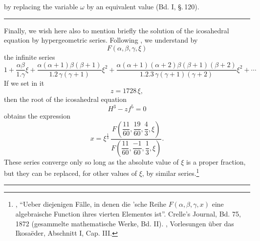 by replacing the variable $\omega$ by an equivalent value (Bd. I, \S.\,120).

\begin{center}
\rule{0.25\linewidth}{0.4pt}
\end{center}

Finally, we wish here also to mention briefly the solution of the icosahedral equation by hypergeometric series. Following , we understand by
\[
F(\alpha, \beta, \gamma, \xi)
\]
the infinite series
\[
1 + \frac{\alpha\beta}{1.\gamma}\xi + \frac{\alpha(\alpha+1)\beta(\beta+1)}{1.2\,\gamma(\gamma+1)}\xi^2 + \frac{\alpha(\alpha+1)(\alpha+2)\beta(\beta+1)(\beta+2)}{1.2.3\,\gamma(\gamma+1)(\gamma+2)}\xi^2 + \cdots
\]
If we set in it
\[
z = 1728\,\xi,
\]
then the root of the icosahedral equation
\[
H^3 - zf^5 = 0
\]
obtains the expression
\[
x = \xi^{\frac{1}{3}}\,\frac{F\left(\dfrac{11}{60}, \dfrac{19}{60}, \dfrac{4}{3}, \xi\right)}{F\left(\dfrac{11}{60}, \dfrac{-1}{60}, \dfrac{1}{3}, \xi\right)}.
\]
These series converge only so long as the absolute value of $\xi$ is a proper fraction, but they can be replaced, for other values of $\xi$, by similar series.\footnote{, ``Ueber diejenigen Fälle, in denen die 'sche Reihe $F(\alpha,\beta,\gamma,x)$ eine algebraische Function ihres vierten Elementes ist''. Crelle's Journal, Bd. 75, 1872 (gesammelte mathematische Werke, Bd. II). , Vorlesungen über das Ikosaëder, Abschnitt I, Cap. III.}

\begin{center}
\rule{0.25\linewidth}{0.4pt}
\end{center}
